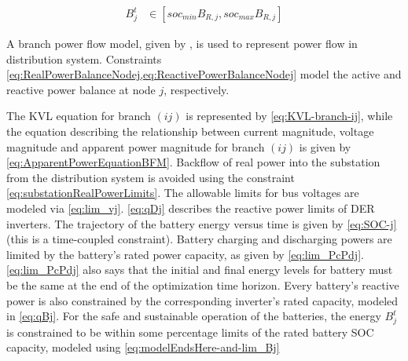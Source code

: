 \documentclass[../../outputs/main.tex]{subfiles}
\begin{document}
\vspace{-1.5em} %

\begin{align}
    { B^{t}_{j} } &\in { \left[ soc_{min}B_{R, j}, soc_{max}B_{R, j} \right] } \label{eq:modelEndsHere-and-lim_Bj}
\end{align}

A branch power flow model, given by , is used to represent power flow in distribution system.   Constraints \cref{eq:RealPowerBalanceNodej,eq:ReactivePowerBalanceNodej} model the active and reactive power balance at node $j$, respectively.

The KVL equation for branch $(ij)$ is represented by \cref{eq:KVL-branch-ij}, while the equation describing the relationship between current magnitude, voltage magnitude and apparent power magnitude for branch $(ij)$ is given by \cref{eq:ApparentPowerEquationBFM}. Backflow of real power into the substation from the distribution system is avoided using the constraint \cref{eq:substationRealPowerLimits}. The allowable limits for bus voltages are modeled via \cref{eq:lim_vj}. \cref{eq:qDj} describes the reactive power limits of DER inverters. The trajectory of the battery energy versus time is given by \cref{eq:SOC-j} (this is a time-coupled constraint). Battery charging and discharging powers are limited by the battery's rated power capacity, as given by \cref{eq:lim_PcPdj}. \cref{eq:lim_PcPdj} also says that the initial and final energy levels for battery must be the same at the end of the optimization time horizon. Every battery's reactive power is also constrained by the corresponding inverter's rated capacity, modeled in \cref{eq:qBj}. For the safe and sustainable operation of the batteries, the energy $B^{t}_{j}$ is constrained to be within some percentage limits of the rated battery SOC capacity, modeled using \cref{eq:modelEndsHere-and-lim_Bj}

\end{document}
